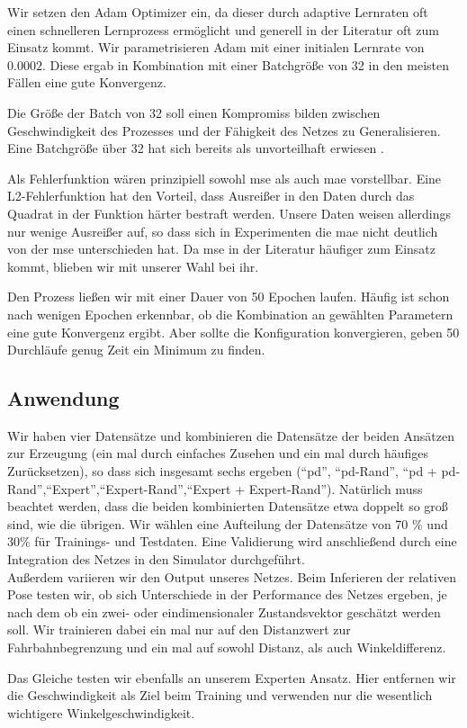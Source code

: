 Wir setzen den Adam Optimizer ein, da dieser durch adaptive Lernraten oft einen schnelleren Lernprozess ermöglicht und generell in der Literatur oft zum Einsatz kommt. Wir parametrisieren Adam mit einer initialen Lernrate von $0.0002$. Diese ergab in Kombination mit einer Batchgröße von 32 in den meisten Fällen eine gute Konvergenz.

Die Größe der Batch von 32 soll einen Kompromiss bilden zwischen Geschwindigkeit des Prozesses und der Fähigkeit des Netzes zu Generalisieren. Eine Batchgröße über 32 hat sich bereits als unvorteilhaft erwiesen \cite{keskar2017largebatch}.

Als Fehlerfunktion wären prinzipiell sowohl \acs{mse} als auch \acs{mae} vorstellbar. Eine L2-Fehlerfunktion hat den Vorteil, dass Ausreißer in den Daten durch das Quadrat in der Funktion härter bestraft werden. Unsere Daten weisen allerdings nur wenige Ausreißer auf, so dass sich in Experimenten die \acs{mae} nicht deutlich von der \acs{mse} unterschieden hat. Da \acs{mse} in der Literatur häufiger zum Einsatz kommt, blieben wir mit unserer Wahl bei ihr.

Den Prozess ließen wir mit einer Dauer von 50 Epochen laufen.  Häufig ist schon nach wenigen Epochen erkennbar, ob die Kombination an gewählten Parametern eine gute Konvergenz ergibt. Aber sollte die Konfiguration konvergieren, geben 50 Durchläufe genug Zeit ein Minimum zu finden.

\subsection{Anwendung}

Wir haben vier Datensätze und kombinieren die Datensätze der beiden Ansätzen zur Erzeugung (ein mal durch einfaches Zusehen und ein mal durch häufiges Zurücksetzen), so dass sich insgesamt sechs ergeben (``\acs{pd}'', ``\acs{pd}-Rand'', ``\acs{pd} + \acs{pd}-Rand'',``Expert'',``Expert-Rand'',``Expert + Expert-Rand''). Natürlich muss beachtet werden, dass die beiden kombinierten Datensätze etwa doppelt so groß sind, wie die übrigen. Wir wählen eine Aufteilung der Datensätze von 70 \% und 30\% für Trainings- und Testdaten. Eine Validierung wird anschließend durch eine Integration des Netzes in den Simulator durchgeführt.\\

Außerdem variieren wir den Output unseres Netzes. Beim Inferieren der relativen Pose testen wir, ob sich Unterschiede in der Performance des Netzes ergeben, je nach dem ob ein zwei- oder eindimensionaler Zustandsvektor geschätzt werden soll. Wir trainieren dabei ein mal nur auf den Distanzwert zur Fahrbahnbegrenzung und ein mal auf sowohl Distanz, als auch Winkeldifferenz.

Das Gleiche testen wir ebenfalls an unserem Experten Ansatz. Hier entfernen wir die Geschwindigkeit als Ziel beim Training und verwenden nur die wesentlich wichtigere Winkelgeschwindigkeit.
